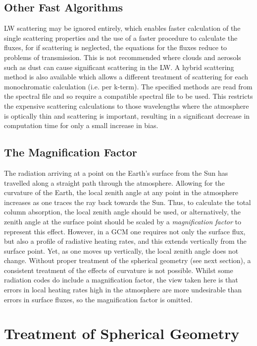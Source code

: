 \subsection{Other Fast Algorithms}

LW scattering may be ignored entirely, which enables faster 
calculation of the single scattering properties and the use of a faster 
procedure to calculate the fluxes, for if scattering is neglected, the
equations for the fluxes reduce to problems of transmission. This is
not recommended where clouds and aerosols such as dust can cause
significant scattering in the LW. A hybrid scattering method is also
available which allows a different treatment of scattering for each
monochromatic calculation (i.e. per k-term). The specified methods are
read from the spectral file and so require a compatible spectral file
to be used. This restricts the expensive scattering calculations to
those wavelengths where the atmosphere is optically thin and scattering
is important, resulting in a significant decrease in computation time
for only a small increase in bias.


\subsection{The Magnification Factor}

The radiation arriving at a point on the Earth's surface from the Sun has
travelled along a straight path through the atmosphere. Allowing for the
curvature of the Earth, the local zenith angle at any point in the atmosphere
increases as one traces the ray back towards the Sun. Thus, to calculate
the total column absorption, the local zenith angle should be used, or
alternatively, the zenith angle at the surface point should be scaled by
a {\em magnification factor} to represent this effect. However, in a GCM
one requires not only the surface flux, but also a profile of radiative
heating rates, and this extends vertically from the surface point. Yet, as one
moves up vertically, the local zenith angle does not change. Without proper
treatment of the spherical geometry (see next section), a consistent treatment
of the effects of curvature is not possible. Whilst some radiation codes do
include a magnification factor, the view taken here is that errors in local
heating rates high in the atmosphere are more undesirable than errors in 
surface fluxes, so the magnification factor is omitted.


\section{Treatment of Spherical Geometry}

